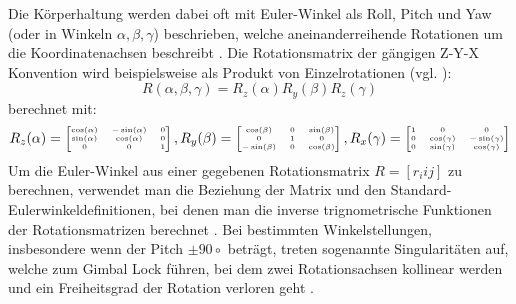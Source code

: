 Die Körperhaltung werden dabei oft mit Euler-Winkel als Roll, Pitch und Yaw (oder in Winkeln $\alpha, \beta, \gamma$) beschrieben, welche aneinanderreihende Rotationen um die Koordinatenachsen beschreibt \cite{Siciliano2016Handbook}. Die Rotationsmatrix der gängigen Z-Y-X Konvention wird beispielsweise als Produkt von Einzelrotationen (vgl. \cite{Siciliano2016Handbook}):
\begin{equation}
	R(\alpha, \beta, \gamma) = R_z(\alpha)R_y(\beta)R_z(\gamma)
\end{equation} 
berechnet mit:
\begin{equation}
\tiny
	R_z(\alpha) = 
	\begin{bmatrix}
		\cos(\alpha) & -\sin(\alpha) & 0 \\
		\sin(\alpha) & \cos(\alpha) & 0 \\
		0 & 0 & 1
	\end{bmatrix}, 
	R_y(\beta) = 
	\begin{bmatrix}
		\cos(\beta) & 0 & \sin(\beta) \\
		0 & 1 & 0 \\
		-\sin(\beta) & 0 & \cos(\beta)
	\end{bmatrix}, 
	R_x(\gamma) = 
	\begin{bmatrix}
		1 & 0 & 0 \\
		0 & \cos(\gamma) & -\sin(\gamma) \\
		0 & \sin(\gamma) & \cos(\gamma)
	\end{bmatrix}
\normalsize
\end{equation}
Um die Euler-Winkel aus einer gegebenen Rotationsmatrix $R = [r_i{ij}]$ zu berechnen, verwendet man die Beziehung der Matrix und den Standard-Eulerwinkeldefinitionen, bei denen man die inverse trignometrische Funktionen der Rotationsmatrizen berechnet \cite{Siciliano2016Handbook}. \newline
Bei bestimmten Winkelstellungen, insbesondere wenn der Pitch $\pm90\circ$ beträgt, treten sogenannte Singularitäten auf, welche zum Gimbal Lock führen, bei dem zwei Rotationsachsen kollinear werden und ein Freiheitsgrad der Rotation verloren geht \cite{Siciliano2016Handbook}.

